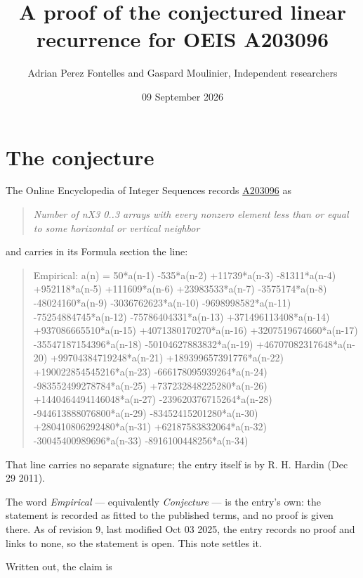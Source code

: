 \documentclass[11pt]{article}
\title{A proof of the conjectured linear recurrence for OEIS A203096}
\author{Adrian Perez Fontelles and Gaspard Moulinier, Independent researchers}
\date{09 September 2026}
\theoremstyle{definition}
\begin{document}
\maketitle
\section{The conjecture}

The Online Encyclopedia of Integer Sequences records \href{https://oeis.org/A203096}{A203096} as

\begin{quote}\itshape Number of nX3 0..3 arrays with every nonzero element less than or equal to some horizontal or vertical neighbor\end{quote}

and carries in its Formula section the line:

\begin{quote}\ttfamily Empirical: a(n) = 50*a(n-1) -535*a(n-2) +11739*a(n-3) -81311*a(n-4) +952118*a(n-5) +111609*a(n-6) +23983533*a(n-7) -3575174*a(n-8) -48024160*a(n-9) -3036762623*a(n-10) -9698998582*a(n-11) -75254884745*a(n-12) -75786404331*a(n-13) +371496113408*a(n-14) +937086665510*a(n-15) +4071380170270*a(n-16) +3207519674660*a(n-17) -35547187154396*a(n-18) -50104627883832*a(n-19) +46707082317648*a(n-20) +99704384719248*a(n-21) +189399657391776*a(n-22) +190022854545216*a(n-23) -666178095939264*a(n-24) -983552499278784*a(n-25) +737232848225280*a(n-26) +1440464494146048*a(n-27) -239620376715264*a(n-28) -944613888076800*a(n-29) -83452415201280*a(n-30) +280410806292480*a(n-31) +62187583832064*a(n-32) -30045400989696*a(n-33) -8916100448256*a(n-34)\end{quote}

That line carries no separate signature; the entry itself is by R. H. Hardin (Dec 29 2011).

The word {\itshape Empirical} --- equivalently {\itshape Conjecture} --- is the entry's own: the statement is recorded as fitted to the published terms, and no proof is given there. As of revision 9, last modified Oct 03 2025, the entry records no proof and links to none, so the statement is open. This note settles it.

Written out, the claim is
\end{document}
